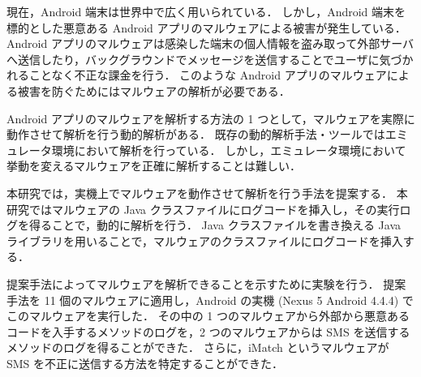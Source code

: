 \setlength{\parindent}{10pt}

現在，Android 端末は世界中で広く用いられている．
しかし，Android 端末を標的とした悪意ある Android アプリのマルウェアによる被害が発生している．
Android アプリのマルウェアは感染した端末の個人情報を盗み取って外部サーバへ送信したり，バックグラウンドでメッセージを送信することでユーザに気づかれることなく不正な課金を行う．
このような Android アプリのマルウェアによる被害を防ぐためにはマルウェアの解析が必要である．


Android アプリのマルウェアを解析する方法の 1 つとして，マルウェアを実際に動作させて解析を行う動的解析がある．
既存の動的解析手法・ツールではエミュレータ環境において解析を行っている．
しかし，エミュレータ環境において挙動を変えるマルウェアを正確に解析することは難しい．

本研究では，実機上でマルウェアを動作させて解析を行う手法を提案する．
本研究ではマルウェアの Java クラスファイルにログコードを挿入し，その実行ログを得ることで，動的に解析を行う．
Java クラスファイルを書き換える Java ライブラリを用いることで，マルウェアのクラスファイルにログコードを挿入する．

提案手法によってマルウェアを解析できることを示すために実験を行う．
提案手法を 11 個のマルウェアに適用し，Android の実機 (Nexus 5 Android 4.4.4) でこのマルウェアを実行した．
その中の 1 つのマルウェアから外部から悪意あるコードを入手するメソッドのログを，2 つのマルウェアからは SMS を送信するメソッドのログを得ることができた．
さらに，iMatch というマルウェアが SMS を不正に送信する方法を特定することができた．